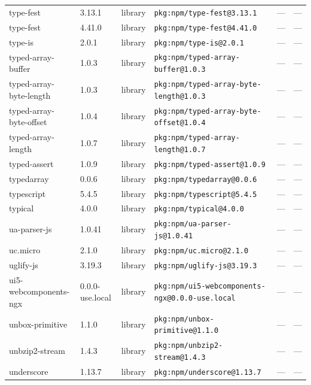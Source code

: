 \documentclass[11pt,a4paper]{article}
\begin{document}
\begin{longtable}{|p{4cm}|p{2cm}|p{1.6cm}|p{5cm}|p{1.5cm}|p{3.5cm}|}
\raggedright type-fest & 3.13.1 & library & \small\texttt{pkg:npm/type-fest@3.13.1} & — & \small — \\
\raggedright type-fest & 4.41.0 & library & \small\texttt{pkg:npm/type-fest@4.41.0} & — & \small — \\
\raggedright type-is & 2.0.1 & library & \small\texttt{pkg:npm/type-is@2.0.1} & — & \small — \\
\raggedright typed-array-buffer & 1.0.3 & library & \small\texttt{pkg:npm/typed-array-buffer@1.0.3} & — & \small — \\
\raggedright typed-array-byte-length & 1.0.3 & library & \small\texttt{pkg:npm/typed-array-byte-length@1.0.3} & — & \small — \\
\raggedright typed-array-byte-offset & 1.0.4 & library & \small\texttt{pkg:npm/typed-array-byte-offset@1.0.4} & — & \small — \\
\raggedright typed-array-length & 1.0.7 & library & \small\texttt{pkg:npm/typed-array-length@1.0.7} & — & \small — \\
\raggedright typed-assert & 1.0.9 & library & \small\texttt{pkg:npm/typed-assert@1.0.9} & — & \small — \\
\raggedright typedarray & 0.0.6 & library & \small\texttt{pkg:npm/typedarray@0.0.6} & — & \small — \\
\raggedright typescript & 5.4.5 & library & \small\texttt{pkg:npm/typescript@5.4.5} & — & \small — \\
\raggedright typical & 4.0.0 & library & \small\texttt{pkg:npm/typical@4.0.0} & — & \small — \\
\raggedright ua-parser-js & 1.0.41 & library & \small\texttt{pkg:npm/ua-parser-js@1.0.41} & — & \small — \\
\raggedright uc.micro & 2.1.0 & library & \small\texttt{pkg:npm/uc.micro@2.1.0} & — & \small — \\
\raggedright uglify-js & 3.19.3 & library & \small\texttt{pkg:npm/uglify-js@3.19.3} & — & \small — \\
\raggedright ui5-webcomponents-ngx & 0.0.0-use.local & library & \small\texttt{pkg:npm/ui5-webcomponents-ngx@0.0.0-use.local} & — & \small — \\
\raggedright unbox-primitive & 1.1.0 & library & \small\texttt{pkg:npm/unbox-primitive@1.1.0} & — & \small — \\
\raggedright unbzip2-stream & 1.4.3 & library & \small\texttt{pkg:npm/unbzip2-stream@1.4.3} & — & \small — \\
\raggedright underscore & 1.13.7 & library & \small\texttt{pkg:npm/underscore@1.13.7} & — & \small — \\

\end{longtable}
\end{document}
